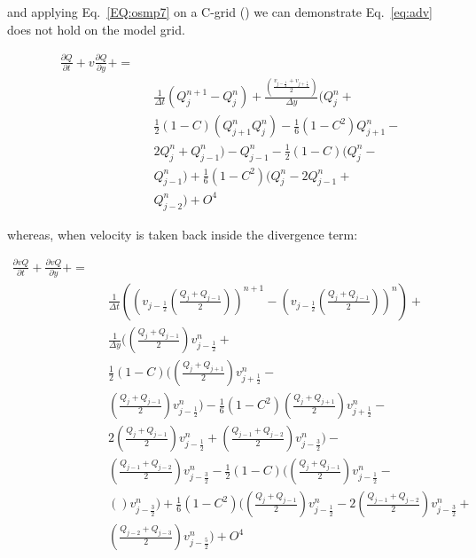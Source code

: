\documentclass[a4paper,12pt, openright, titlepage]{book}
\begin{document}
\begin{appendices}
and applying Eq.~\ref{EQ:osmp7} on a C-grid () we can demonstrate Eq.~\ref{eq:adv} does not hold on the model grid.

\begin{eqnarray}\nonumber
\nonumber \frac{\partial Q}{\partial t} + v\frac{\partial Q}{\partial y} +  = \\
\nonumber &&
\left. \frac{1}{\Delta t}
\left( Q_j ^{n+1} - Q_j ^{n} \right) 
+ \frac{\left( \frac{v_{j-\frac{1}{2}}+v_{j+\frac{1}{2}}}{2}\right)}{\Delta y} 
( 
Q_j ^n + \right. \\ \nonumber
&& \left.
\frac{1}{2} (1-C)(
Q_{j+1} ^{n} 
Q_j ^{n})  - \frac{1}{6}  (1-C^2 )
Q_{j+1} ^{n} -\right. \\ \nonumber
&& \left.
 2Q_j ^{n}
+ Q_{j-1} ^{n} )-Q_{j-1} ^n -
\frac{1}{2} (1-C)(
 Q_{j} ^{n} -
\right. \\ \nonumber 
&& \left.
Q_{j-1} ^{n})  
+   \frac{1}{6}  (1-C^2 )(
Q_{j} ^{n} - 2
Q_{j-1} ^{n} + 
\right. \\ 
&& \left. 
 Q_{j-2} ^{n} )
 + O^4 \right.
\label{EQ:unabT}
\end{eqnarray}

whereas, when velocity is taken back inside the divergence term:

\begin{eqnarray}\nonumber
\nonumber \frac{\partial vQ}{\partial t} + \frac{\partial vQ}{\partial y} +  = \\
\nonumber &&
\left. \frac{1}{\Delta t}
\left( \left(v_{j-\frac{1}{2}}\left(\frac{Q_j+Q_{j-1}}{2}\right)\right) ^{n+1} - \left(v_{j-\frac{1}{2}}(\frac{Q_j+Q_{j-1}}{2})\right) ^{n} \right) 
+ 
\right. \\ \nonumber
 &&\left.
\frac{1}{\Delta y} 
( \left( \frac{Q_j+Q_{j-1}}{2} \right)
v_{j-\frac{1}{2}} ^n + \right. \\ \nonumber
&& \left.
\frac{1}{2} (1-C)(
\left(\frac{Q_j+Q_{j+1}}{2}\right)
v_{j+\frac{1}{2}} ^{n} - \right. \\ \nonumber
&& \left.
\left(  \frac{Q_j+Q_{j-1}}{2} \right)
v_{j-\frac{1}{2}} ^{n})  - \frac{1}{6}  (1-C^2 )
\left( \frac{Q_j+Q_{j+1}}{2} \right)
v_{j+\frac{1}{2}} ^{n} -\right. \\ \nonumber
&& \left.
 2\left( \frac{Q_j+Q_{j-1}}{2}\right)v_{j-\frac{1}{2}} ^{n}
+ \left( \frac{Q_{j-1}+Q_{j-2}}{2}\right)v_{j-\frac{3}{2}} ^{n} )-
\right. \\ \nonumber 
&& \left.
\left(\frac{Q_{j-1}+Q_{j-2}}{2}\right) v_{j-\frac{3}{2}} ^n -
\frac{1}{2} (1-C)(
\left( \frac{Q_j+Q_{j-1}}{2} \right) v_{j-\frac{1}{2}}  ^{n} -
\right. \\ \nonumber 
&& \left.
\left( \right)v_{j-\frac{3}{2}} ^{n})  
+   \frac{1}{6}  (1-C^2 )(
\left( \frac{Q_j+Q_{j-1}}{2}\right)v_{j-\frac{1}{2}} ^{n} - 2
\left( \frac{Q_{j-1}+Q_{j-2}}{2}\right)v_{j-\frac{3}{2}} ^{n} + 
\right. \\ 
&& \left. 
\left( \frac{Q_{j-2}+Q_{j-3}}{2}\right) v_{j-\frac{5}{2}} ^{n} )
 + O^4 \right.
\label{EQ:nabuT}
\end{eqnarray}


\end{appendices}
\end{document}
